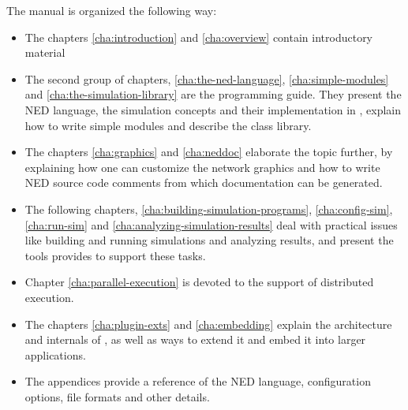 The manual is organized the following way:

\begin{itemize}
  \item{The chapters \ref{cha:introduction} and \ref{cha:overview}
    contain introductory material}
  \item{The second group of chapters,
    \ref{cha:the-ned-language},
    \ref{cha:simple-modules} and
    \ref{cha:the-simulation-library}
    are the programming guide. They present the NED language,
    the simulation concepts and their implementation in {\opp}, explain
    how to write simple modules and describe the class library.}
  \item{The chapters \ref{cha:graphics} and \ref{cha:neddoc}
    elaborate the topic further, by explaining how one can customize
    the network graphics and how to write NED source code comments
    from which documentation can be generated.}
  \item{The following chapters, \ref{cha:building-simulation-programs},
    \ref{cha:config-sim}, \ref{cha:run-sim} and
    \ref{cha:analyzing-simulation-results} deal with practical issues
    like building and running simulations and analyzing results, and
    present the tools {\opp} provides to support these tasks.}
  \item{Chapter \ref{cha:parallel-execution} is devoted to the support
    of distributed execution.}
  \item{The chapters \ref{cha:plugin-exts} and \ref{cha:embedding}
    explain the architecture and internals of {\opp}, as well as
    ways to extend it and embed it into larger applications.}
  \item{The appendices provide a reference of the NED language,
    configuration options, file formats and other details.}
\end{itemize}




